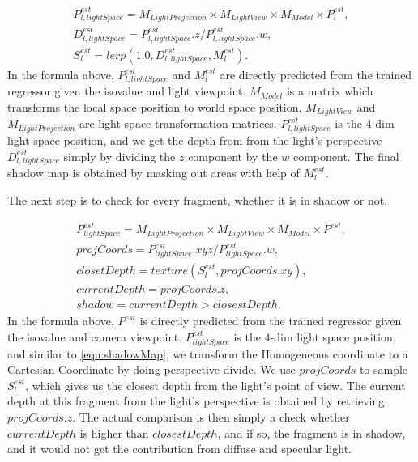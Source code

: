 \documentclass[journal]{vgtc}                %
\begin{document}
\begin{equation}
\begin{aligned}
P_{l, lightSpace}^{est} = M_{LightProjection} \times M_{LightView} \times M_{Model} \times P_l^{est}, \\
D_{l, lightSpace}^{est} = P_{l, lightSpace}^{est}.z / P_{l, lightSpace}^{est}.w, \\
S_{l}^{est} = lerp(1.0, D_{l, lightSpace}^{est}, M_{l}^{est}). 
\label{equ:shadowMap}
\end{aligned}
\end{equation}
In the formula above, $P_{l, lightSpace}^{est}$ and $M_{l}^{est}$ are directly predicted from the trained regressor given the isovalue and light viewpoint. $ M_{Model}$ is a matrix which transforms the local space position to world space position. $M_{LightView}$ and $ M_{LightProjection}$ are light space transformation matrices. $P_{l, lightSpace}^{est}$ is the 4-dim light space position, and we get the depth from from the light's perspective $D_{l, lightSpace}^{est}$ simply by dividing the $z$ component by the $w$ component. The final shadow map is obtained by masking out areas with help of $M_{l}^{est}$.      

The next step is to check for every fragment, whether it is in shadow or not. 

\begin{equation}
\begin{aligned}
P_{lightSpace}^{est} = M_{LightProjection} \times M_{LightView} \times M_{Model} \times P^{est}, \\
projCoords = P_{lightSpace}^{est}.xyz / P_{lightSpace}^{est}.w, \\ 
closetDepth = texture(S_{l}^{est}, projCoords.xy), \\
currentDepth = projCoords.z, \\
shadow = currentDepth > closestDepth.
\end{aligned}
\end{equation}
In the formula above, $P^{est}$ is directly predicted from the trained regressor given the isovalue and camera viewpoint. $P_{lightSpace}^{est}$ is the 4-dim light space position, and similar to \ref{equ:shadowMap}, we transform the Homogeneous coordinate to a Cartesian Coordinate by doing perspective divide. We use $projCoords$ to sample $S_{l}^{est}$, which gives us the closest depth from the light's point of view. The current depth at this fragment from the light's perspective is obtained by retrieving $projCoords.z$. The actual comparison is then simply a check whether $currentDepth$ is higher than $closestDepth$, and if so, the fragment is in shadow, and it would not get the contribution from diffuse and specular light. 
\end{document}
